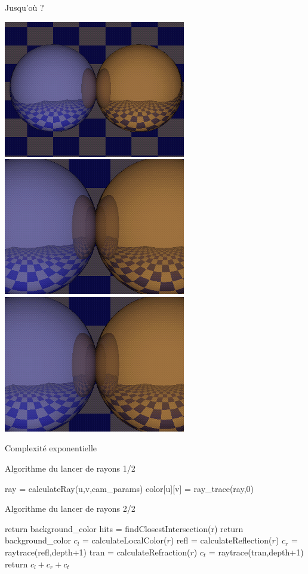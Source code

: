 \begin{frame}{Jusqu'où ?}
    \begin{center}
        \includegraphics[width=.3\textwidth]{figs/recur-1.png}
        \includegraphics[width=.3\textwidth]{figs/recur-2.png}
        \includegraphics[width=.3\textwidth]{figs/recur-3.png}
    \end{center}
    Complexité exponentielle
\end{frame}

\begin{frame}{Algorithme du lancer de rayons 1/2}
    \begin{algorithmic}[1]
                \State ray = calculateRay(u,v,cam\_params)
                \State color[u][v] = ray\_trace(ray,0)
            \EndFor
        \EndFor
     \end{algorithmic}
\end{frame}

\begin{frame}{Algorithme du lancer de rayons 2/2}
            \begin{algorithmic}[1]
                    \State return background\_color 
                \EndIf
                \State hits = findClosestIntersection(r)
                    \State return background\_color 
                \EndIf
                \State $c_l$ = calculateLocalColor($r$)
                \State refl = calculateReflection($r$)
                \State $c_r$ = raytrace(refl,depth+1)
                \State tran = calculateRefraction($r$)
                \State $c_t$ = raytrace(tran,depth+1)
                \State return $c_l + c_r + c_t$
       \EndFunction 
             \end{algorithmic}
\end{frame}

